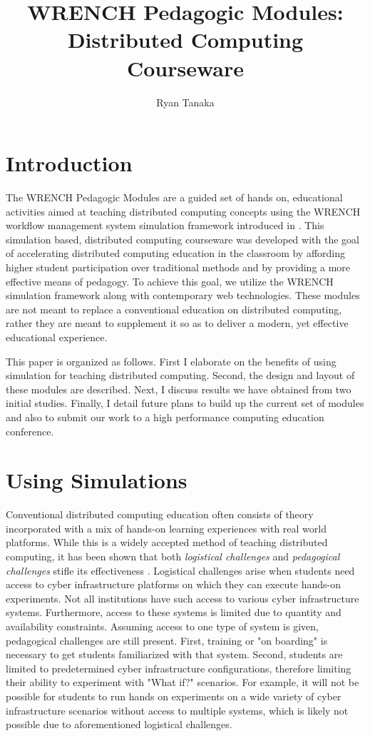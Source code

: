 \documentclass{article}
\begin{document}
\title{WRENCH Pedagogic Modules: Distributed Computing Courseware}
\author{Ryan Tanaka}

\maketitle

\section{Introduction}
The WRENCH Pedagogic Modules are a guided set of hands on, educational
activities aimed at teaching distributed computing concepts using the WRENCH
workflow management system simulation framework introduced in \cite{wrench}.
This simulation based, distributed computing courseware was developed with the
goal of accelerating distributed computing education in the classroom by
affording higher student participation over traditional methods and by providing
a more effective means of pedagogy. To achieve this goal, we utilize the WRENCH
simulation framework along with contemporary web technologies. These modules are
not meant to replace a conventional education on distributed computing, rather
they are meant to supplement it so as to deliver a modern, yet effective
educational  experience.

This paper is organized as follows. First I elaborate on the benefits of using
simulation for teaching  distributed computing. Second, the design and layout of
these modules are described. Next, I discuss results we have obtained from two
initial studies. Finally, I detail future plans to build up the current set of
modules and also to submit our work to a high performance computing education
conference.

\section{Using Simulations}
Conventional distributed computing education often consists of theory
incorporated with a mix of hands-on learning experiences with real world
platforms. While this is a widely accepted method of teaching distributed computing,
it has been shown that both \textit{logistical challenges} and \textit{pedagogical challenges}
stifle its effectiveness \cite{smpi-courseware}. Logistical challenges arise when
students need access to cyber infrastructure platforms on which they can execute
hands-on experiments. Not all institutions have such access to various 
cyber infrastructure systems. Furthermore, access to these systems is limited due
to quantity and availability constraints. Assuming access to one type of system is
given, pedagogical challenges are still present. First, training or "on boarding" is necessary
to get students familiarized with that system. Second, students are limited to 
predetermined cyber infrastructure configurations, therefore limiting their ability to
experiment with "What if?" scenarios. For example, it will not be possible for students to 
run hands on experiments on a wide variety of cyber infrastructure scenarios without
access to multiple systems, which is likely not possible due to aforementioned 
logistical challenges. 
\end{document}

